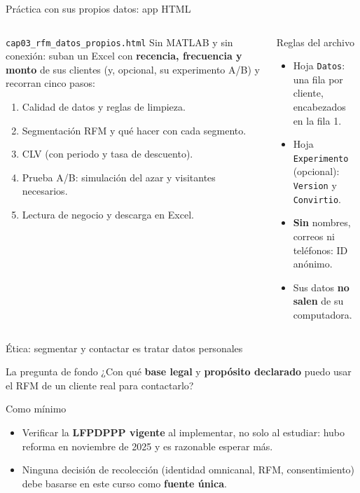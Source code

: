 \documentclass[aspectratio=169,xcolor=dvipsnames]{beamer}
\begin{document}
\begin{frame}{Práctica con sus propios datos: app HTML}
\begin{columns}[T]
  \begin{block}{\texttt{cap03\_rfm\_datos\_propios.html}}
    \small Sin MATLAB y sin conexión: suban un Excel con \textbf{recencia, frecuencia y monto} de sus clientes (y, opcional, su experimento A/B) y recorran cinco pasos:
    \scriptsize
    \begin{enumerate}
      \item Calidad de datos y reglas de limpieza.
      \item Segmentación RFM y qué hacer con cada segmento.
      \item CLV (con periodo y tasa de descuento).
      \item Prueba A/B: simulación del azar y visitantes necesarios.
      \item Lectura de negocio y descarga en Excel.
    \end{enumerate}
  \end{block}
  \begin{exampleblock}{Reglas del archivo}
    \scriptsize
    \begin{itemize}
      \item Hoja \texttt{Datos}: una fila por cliente, encabezados en la fila 1.
      \item Hoja \texttt{Experimento} (opcional): \texttt{Version} y \texttt{Convirtio}.
      \item \textbf{Sin} nombres, correos ni teléfonos: ID anónimo.
      \item Sus datos \textbf{no salen} de su computadora.
    \end{itemize}
  \end{exampleblock}
\end{columns}
\end{frame}

\begin{frame}{Ética: segmentar y contactar es tratar datos personales}
\begin{alertblock}{La pregunta de fondo}
  ¿Con qué \textbf{base legal} y \textbf{propósito declarado} puedo usar el RFM de un cliente real para contactarlo?
\end{alertblock}
\begin{block}{Como mínimo}
  \begin{itemize}
    \item Verificar la \textbf{LFPDPPP vigente} al implementar, no solo al estudiar: hubo reforma en noviembre de 2025 y es razonable esperar más.
    \item Ninguna decisión de recolección (identidad omnicanal, RFM, consentimiento) debe basarse en este curso como \textbf{fuente única}.
  \end{itemize}
\end{block}
\end{frame}
\end{document}
